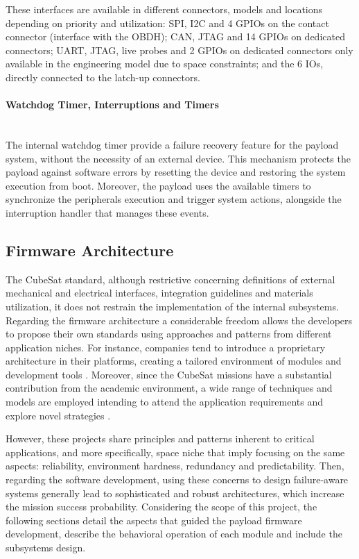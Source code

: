 These interfaces are available in different connectors, models and locations depending on priority and utilization: SPI, I2C and 4 GPIOs on the contact connector (interface with the OBDH); CAN, JTAG and 14 GPIOs on dedicated connectors; UART, JTAG, live probes and 2 GPIOs on dedicated connectors only available in the engineering model due to space constraints; and the 6 IOs, directly connected to the latch-up connectors. 

\paragraph{Watchdog Timer, Interruptions and Timers} \mbox{}\\

The internal watchdog timer provide a failure recovery feature for the payload system, without the necessity of an external device. This mechanism protects the payload  against software errors by resetting the device and restoring the system execution from boot. Moreover, the payload uses the available timers to synchronize the peripherals execution and trigger system actions, alongside the interruption handler that manages these events.  



\subsection{Firmware Architecture}

The CubeSat standard, although restrictive concerning definitions of external mechanical and electrical interfaces, integration guidelines and materials utilization, it does not restrain the implementation of the internal subsystems. Regarding the firmware architecture a considerable freedom allows the developers to propose their own standards using approaches and patterns from different application niches. For instance, companies tend to introduce a proprietary architecture in their platforms, creating a tailored environment of modules and development tools \cite{gomspace} \cite{isis} \cite{endurosat}. Moreover, since the CubeSat missions have a substantial contribution from the academic environment, a wide range of techniques and models are employed intending to attend the application requirements and explore novel strategies \cite{polysat} \cite{floripasat}. 

However, these projects share principles and patterns inherent to critical applications, and more specifically, space niche that imply focusing on the same aspects: reliability, environment hardness, redundancy and predictability. Then, regarding the software development, using these concerns to design failure-aware systems generally lead to sophisticated and robust architectures, which increase the mission success probability. Considering the scope of this project, the following sections detail the aspects that guided the payload firmware development, describe the behavioral operation of each module and include the subsystems design.

